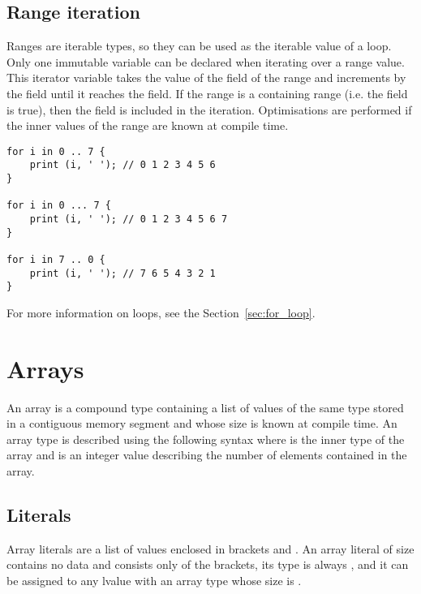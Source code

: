\subsection {Range iteration}

 Ranges are iterable types, so they can be used as the iterable value of a
  loop. Only one immutable variable can be declared when iterating
 over a range value. This iterator variable takes the value of the 
 field of the range and increments by the  field until it reaches
 the  field. If the range is a containing range (i.e. the
  field is true), then the  field is included in
 the iteration. Optimisations are performed if the inner values of the range are
 known at compile time.

\begin{lstlisting}[style=coloredverbatim]
for i in 0 .. 7 {
    print (i, ' '); // 0 1 2 3 4 5 6
}

for i in 0 ... 7 {
    print (i, ' '); // 0 1 2 3 4 5 6 7
}

for i in 7 .. 0 {
    print (i, ' '); // 7 6 5 4 3 2 1
}
\end{lstlisting}

For more information on  loops, see the Section~\ref{sec:for_loop}.

\vfill%
\pagebreak

\section{Arrays}

 An array is a compound type containing a list of values of the same type stored
 in a contiguous memory segment and whose size is known at compile time. An
 array type is described using the following syntax \token{[T ; N]} where
  is the inner type of the array and  is an integer value
 describing the number of elements contained in the array.

\subsection {Literals}

Array literals are a list of values enclosed in brackets \token{[} and
  \token{]}. An array literal of size  contains no data and consists
only of the brackets, its type is always \token{[void ; 0]}, and it can be
assigned to any lvalue with an array type whose size is .

